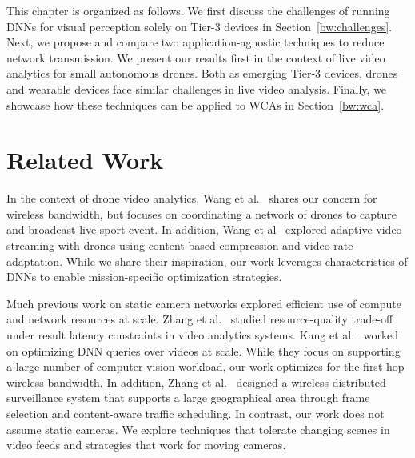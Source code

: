 This chapter is organized as follows. We first discuss the challenges of running
DNNs for visual perception solely on Tier-3 devices in
Section~\ref{bw:challenges}. Next, we propose and compare two
application-agnostic techniques to reduce network transmission. We present our
results first in the context of live video analytics for small autonomous
drones. Both as emerging Tier-3 devices, drones and wearable devices face
similar challenges in live video analysis. Finally, we showcase how these
techniques can be applied to WCAs in Section~\ref{bw:wca}.







\section{Related Work}
\label{bw:relatedwork}

In the context of drone video analytics, Wang et al.~\cite{Wang2017networked}
shares our concern for wireless bandwidth, but focuses on coordinating a network
of drones to capture and broadcast live sport event. In addition, Wang et
al~\cite{Wang2016skyeyes} explored adaptive video streaming with drones using
content-based compression and video rate adaptation. While we share their
inspiration, our work leverages characteristics of DNNs to enable
mission-specific optimization strategies.

Much previous work on static camera networks explored efficient use of compute
and network resources at scale. Zhang et al.~\cite{zhang2017live} studied
resource-quality trade-off under result latency constraints in video analytics
systems. Kang et al.~\cite{kang2017noscope} worked on optimizing DNN queries
over videos at scale. While they focus on supporting a large number of computer
vision workload, our work optimizes for the first hop wireless bandwidth. In
addition, Zhang et al.~\cite{zhang2015design} designed a wireless distributed
surveillance system that supports a large geographical area through frame
selection and content-aware traffic scheduling. In contrast, our work does not
assume static cameras. We explore techniques that tolerate changing scenes in
video feeds and strategies that work for moving cameras.

